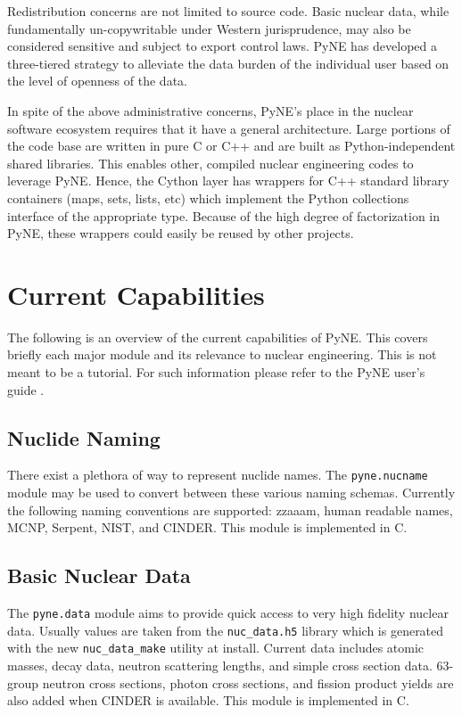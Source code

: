 \documentclass{anstrans}
\begin{document}
Redistribution concerns are not limited to source code.  Basic nuclear data, 
while fundamentally un-copywritable under Western jurisprudence, may also 
be considered sensitive and subject to export control laws.  PyNE has developed
a three-tiered strategy to alleviate the data burden of the individual user based 
on the level of openness of the data. 

In spite of the above administrative concerns, PyNE's place in the nuclear software 
ecosystem requires that it have a general architecture.  Large portions of the code 
base are written in pure C or C++ and are built as Python-independent shared libraries. 
This enables other, compiled nuclear engineering codes to leverage PyNE.  Hence, the 
Cython layer has wrappers for C++ standard library containers (maps, 
sets, lists, etc) which implement the Python collections interface of the 
appropriate type.  Because of the high degree of factorization in PyNE, these wrappers 
could easily be reused by other projects.


\section{Current Capabilities}

The following is an overview of the current capabilities of PyNE.
This covers briefly each major module and its relevance to nuclear 
engineering.  This is not meant to be a tutorial.  For such information
please refer to the PyNE user's guide \cite{PyNE:2012}.

\subsection{Nuclide Naming} 
There exist a plethora of way to represent nuclide names.  The 
\texttt{pyne.nucname} module may be used to convert between these various 
naming schemas. Currently the following naming conventions are supported: 
zzaaam, human readable names, MCNP, Serpent, NIST, and CINDER.  This module is 
implemented in C.


\subsection{Basic Nuclear Data}
The \texttt{pyne.data} module aims to provide quick access to very high fidelity 
nuclear data. Usually values are taken from the \texttt{nuc\_data.h5} library which is 
generated with the new \texttt{nuc\_data\_make} utility at install.  Current 
data includes atomic masses, 
decay data, neutron scattering lengths, and simple cross section data. 63-group
neutron cross sections, photon cross sections, and fission product yields are
also added when CINDER is available.  This module is implemented in C.
\end{document}
